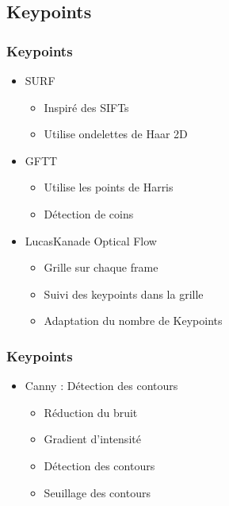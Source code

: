 \subsection{Keypoints}
\begin{frame}
  \frametitle{Keypoints}
  
  \begin{itemize}
  \item SURF
  	\begin{itemize}
  	\item Inspiré des SIFTs
  	\item Utilise ondelettes de Haar 2D
  	\end{itemize}
  	
  \item GFTT
    \begin{itemize}
    \item Utilise les points de Harris
    \item Détection de coins
    \end{itemize}
  	
  \item LucasKanade Optical Flow
    \begin{itemize}
    \item Grille sur chaque frame
    \item Suivi des keypoints dans la grille
    \item Adaptation du nombre de Keypoints
    \end{itemize}
  \end{itemize}

  
\end{frame}  	
  
\begin{frame}
  \frametitle{Keypoints}
  
  \begin{itemize}
  \item Canny : Détection des contours
    \begin{itemize}
  	\item Réduction du bruit
  	\item Gradient d'intensité
  	\item Détection des contours
  	\item Seuillage des contours
  	\end{itemize}
  	
  \end{itemize}


\end{frame}



